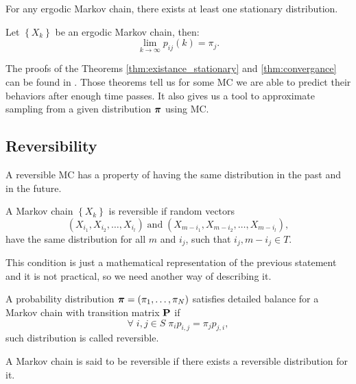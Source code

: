 	\begin{theorem} \label{thm:existance_stationary}
		For any ergodic Markov chain, there exists at least one stationary distribution.
	\end{theorem}
	
	
	\begin{theorem} \label{thm:convergance}
		Let $\left\{X_k\right\}$ be an ergodic Markov chain, then:
		\begin{equation*}
			\lim_{k \rightarrow \infty} p_{ij}(k) = \pi_j.
		\end{equation*}
	\end{theorem}
	The proofs of the Theorems \ref{thm:existance_stationary} and \ref{thm:convergance} can be found in \cite{haggstrom2002finite}. Those theorems tell us for some MC we are able to predict their behaviors after enough time passes. It also gives us a tool to approximate sampling from a given distribution $\boldsymbol{\pi}$ using MC.
	
\subsection{Reversibility}
	A reversible MC has a property of having the same distribution in the past and in the future.
	\begin{definition}[Reversibility]
		A Markov chain $\left\{X_k\right\}$ is reversible if random vectors
		\begin{equation*}
			(X_{i_1}, X_{i_2}, \ldots, X_{i_l}) \; \mathrm{and} \; (X_{m-i_1}, X_{m-i_2}, \ldots, X_{m-i_l}),
		\end{equation*}
		have the same distribution for all $m$ and $i_j$, such that $i_j, m-i_j \in T$.
	\end{definition}
	
	This condition is just a mathematical representation of the previous statement and it is not practical, so we need another way of describing it.
	\begin{definition}
		A probability distribution $\boldsymbol{\pi} = (\pi_1, \ldots, \pi_N)$ satisfies detailed balance for a Markov chain with transition matrix $\mathbf{P}$ if
		\begin{equation*}
			\forall \; i,j \in S \; \pi_i p_{i,j} = \pi_j p_{j,i},
		\end{equation*}
		such distribution is called reversible.
	\end{definition}
	
	\begin{definition}
		A Markov chain is said to be reversible if there exists a reversible distribution for it.
	\end{definition}

